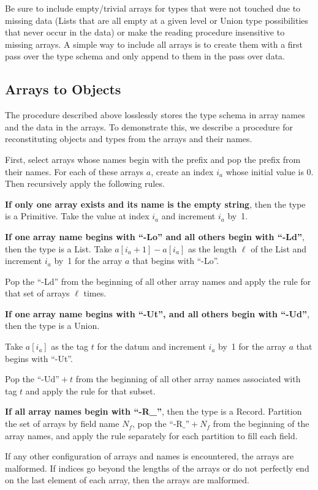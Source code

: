 \documentclass[10pt, conference, compsocconf]{IEEEtran}
\begin{document}
Be sure to include empty/trivial arrays for types that were not touched due to missing data (Lists that are all empty at a given level or Union type possibilities that never occur in the data) or make the reading procedure insensitive to missing arrays. A simple way to include all arrays is to create them with a first pass over the type schema and only append to them in the pass over data.

\subsection{Arrays to Objects}

The procedure described above losslessly stores the type schema in array names and the data in the arrays. To demonstrate this, we describe a procedure for reconstituting objects and types from the arrays and their names.

First, select arrays whose names begin with the prefix and pop the prefix from their names. For each of these arrays $a$, create an index $i_a$ whose initial value is 0. Then recursively apply the following rules.

{\bf If only one array exists and its name is the empty string}, then the type is a Primitive. Take the value at index $i_a$ and increment $i_a$ by~1.

{\bf If one array name begins with ``-Lo'' and all others begin with ``-Ld''}, then the type is a List. Take $a[i_a + 1] - a[i_a]$ as the length $\ell$ of the List and increment $i_a$ by~1 for the array $a$ that begins with ``-Lo''.

Pop the ``-Ld'' from the beginning of all other array names and apply the rule for that set of arrays $\ell$ times.

{\bf If one array name begins with ``-Ut'', and all others begin with ``-Ud''}, then the type is a Union.

Take $a[i_a]$ as the tag $t$ for the datum and increment $i_a$ by~1 for the array $a$ that begins with ``-Ut''.

Pop the $\mbox{``-Ud''} + t$ from the beginning of all other array names associated with tag $t$ and apply the rule for that subset.

{\bf If all array names begin with ``-R\_''}, then the type is a Record. Partition the set of arrays by field name $N_f$, pop the $\mbox{``-R\_''} + N_f$ from the beginning of the array names, and apply the rule separately for each partition to fill each field.

If any other configuration of arrays and names is encountered, the arrays are malformed. If indices go beyond the lengths of the arrays or do not perfectly end on the last element of each array, then the arrays are malformed.
\end{document}
